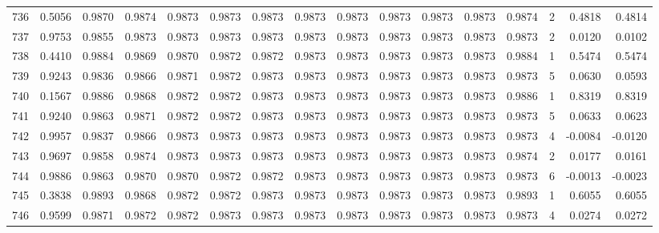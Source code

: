 \begin{tabular}{lrrrrrrrrrrrrrrr}
736 &      0.5056 &  0.9870 &  0.9874 &  0.9873 &  0.9873 &  0.9873 &  0.9873 &  0.9873 &  0.9873 &  0.9873 &   0.9873 &     0.9874 &      2 &                    0.4818 &                     0.4814 \\
737 &      0.9753 &  0.9855 &  0.9873 &  0.9873 &  0.9873 &  0.9873 &  0.9873 &  0.9873 &  0.9873 &  0.9873 &   0.9873 &     0.9873 &      2 &                    0.0120 &                     0.0102 \\
738 &      0.4410 &  0.9884 &  0.9869 &  0.9870 &  0.9872 &  0.9872 &  0.9873 &  0.9873 &  0.9873 &  0.9873 &   0.9873 &     0.9884 &      1 &                    0.5474 &                     0.5474 \\
739 &      0.9243 &  0.9836 &  0.9866 &  0.9871 &  0.9872 &  0.9873 &  0.9873 &  0.9873 &  0.9873 &  0.9873 &   0.9873 &     0.9873 &      5 &                    0.0630 &                     0.0593 \\
740 &      0.1567 &  0.9886 &  0.9868 &  0.9872 &  0.9872 &  0.9873 &  0.9873 &  0.9873 &  0.9873 &  0.9873 &   0.9873 &     0.9886 &      1 &                    0.8319 &                     0.8319 \\
741 &      0.9240 &  0.9863 &  0.9871 &  0.9872 &  0.9872 &  0.9873 &  0.9873 &  0.9873 &  0.9873 &  0.9873 &   0.9873 &     0.9873 &      5 &                    0.0633 &                     0.0623 \\
742 &      0.9957 &  0.9837 &  0.9866 &  0.9873 &  0.9873 &  0.9873 &  0.9873 &  0.9873 &  0.9873 &  0.9873 &   0.9873 &     0.9873 &      4 &                   -0.0084 &                    -0.0120 \\
743 &      0.9697 &  0.9858 &  0.9874 &  0.9873 &  0.9873 &  0.9873 &  0.9873 &  0.9873 &  0.9873 &  0.9873 &   0.9873 &     0.9874 &      2 &                    0.0177 &                     0.0161 \\
744 &      0.9886 &  0.9863 &  0.9870 &  0.9870 &  0.9872 &  0.9872 &  0.9873 &  0.9873 &  0.9873 &  0.9873 &   0.9873 &     0.9873 &      6 &                   -0.0013 &                    -0.0023 \\
745 &      0.3838 &  0.9893 &  0.9868 &  0.9872 &  0.9872 &  0.9873 &  0.9873 &  0.9873 &  0.9873 &  0.9873 &   0.9873 &     0.9893 &      1 &                    0.6055 &                     0.6055 \\
746 &      0.9599 &  0.9871 &  0.9872 &  0.9872 &  0.9873 &  0.9873 &  0.9873 &  0.9873 &  0.9873 &  0.9873 &   0.9873 &     0.9873 &      4 &                    0.0274 &                     0.0272 \\

\end{tabular}
